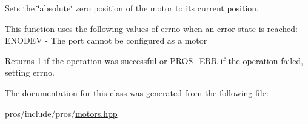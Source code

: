 Sets the \char`\"{}absolute\char`\"{} zero position of the motor to its current position. 

This function uses the following values of errno when an error state is reached\+: E\+N\+O\+D\+EV -\/ The port cannot be configured as a motor

\begin{DoxyReturn}{Returns}
1 if the operation was successful or P\+R\+O\+S\+\_\+\+E\+RR if the operation failed, setting errno. 
\end{DoxyReturn}


The documentation for this class was generated from the following file\+:\begin{DoxyCompactItemize}
\item 
pros/include/pros/\hyperlink{motors_8hpp}{motors.\+hpp}\end{DoxyCompactItemize}
